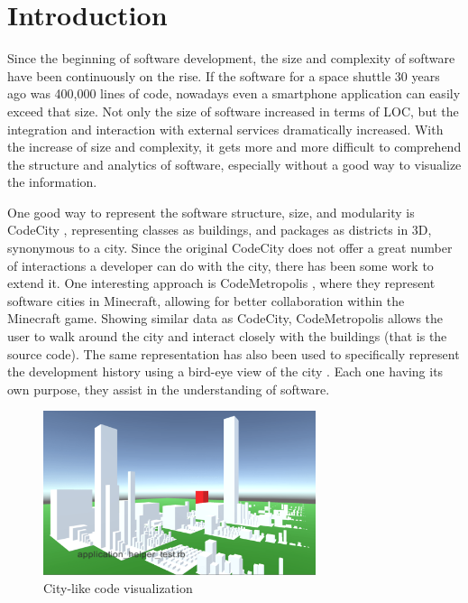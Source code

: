 \documentclass[conference]{IEEEtran}
\begin{document}
\section{Introduction}
Since the beginning of software development, the size and complexity of software have been continuously on the rise.
If the software for a space shuttle 30 years ago was 400,000 lines of code, nowadays even a smartphone application can easily exceed that size.
Not only the size of software increased in terms of LOC, but the integration and interaction with external services dramatically increased.
With the increase of size and complexity, it gets more and more difficult to comprehend the structure and analytics of software, especially without a good way to visualize the information.

One good way to represent the software structure, size, and modularity is CodeCity \cite{Wettel:2011:SSC:1985793.1985868}, representing classes as buildings, and packages as districts in 3D, synonymous to a city.
Since the original CodeCity does not offer a great number of interactions a developer can do with the city, there has been some work to extend it.
One interesting approach is CodeMetropolis \cite{6648194}, where they represent software cities in Minecraft, allowing for better collaboration within the Minecraft game.
Showing similar data as CodeCity, CodeMetropolis allows the user to walk around the city and interact closely with the buildings (that is the source code).
The same representation has also been used to specifically represent the development history using a bird-eye view of the city \cite{Steinbruckner:2010:RDH:1879211.1879239}.
Each one having its own purpose, they assist in the understanding of software.

\begin{figure}[h]
\centering
\includegraphics[width=8cm]{NewROCAT.pdf}
\caption{City-like code visualization}
\label{figure:new-Rocat}
\end{figure}
\end{document}
